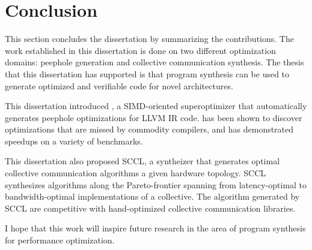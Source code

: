 \chapter{Conclusion}
\label{chap:conclusion}

This section concludes the dissertation by summarizing the contributions.
%
The work established in this dissertation is done on two different optimization
domains: peephole generation and collective communication synthesis.
%
The thesis that this dissertation has supported is that program synthesis can
be used to generate optimized and verifiable code for novel architectures.


This dissertation introduced \minotaur{}, a SIMD-oriented
superoptimizer that automatically
 generates peephole optimizations for LLVM IR code.
%
\minotaur{} has been shown to discover optimizations that are missed by
commodity compilers, and has demonstrated speedups on a variety of
benchmarks.

This dissertation also proposed SCCL, a syntheizer that generates
optimal collective communication algorithms a given hardware topology.
%
SCCL synthesizes algorithms along the Pareto-frontier spanning from
latency-optimal to bandwidth-optimal implementations of a collective.
%
The algorithm generated by SCCL are competitive with hand-optimized
collective communication libraries.


I hope that this work will inspire future research in the area of program
synthesis for performance optimization.
